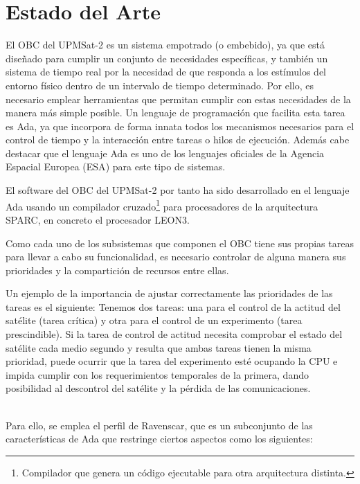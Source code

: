 
\chapter{Estado del Arte}
\label{chap:estado_del_arte}

El OBC del UPMSat-2 es un sistema empotrado (o embebido), ya que está
diseñado para cumplir un conjunto de necesidades específicas, y 
también un sistema de tiempo real por la necesidad de que responda a los
estímulos del entorno físico dentro de un intervalo de tiempo determinado.
Por ello, es necesario emplear herramientas que permitan cumplir con estas
necesidades de la manera más simple posible.
Un lenguaje de programación que facilita esta tarea es Ada, ya que incorpora
de forma innata todos los mecanismos necesarios para el control de tiempo y la
interacción entre tareas o hilos de ejecución.
Además cabe destacar que el lenguaje Ada es
uno de los lenguajes oficiales de la Agencia Espacial Europea
(ESA\cite{web-ESA}) para este tipo de sistemas.

El software del OBC del UPMSat-2 por tanto ha sido desarrollado en el lenguaje
Ada usando un compilador cruzado\footnote{Compilador que genera un código
  ejecutable para otra arquitectura distinta.}
para procesadores de la arquitectura SPARC, en concreto el procesador LEON3.

Como cada uno de los subsistemas que componen el OBC tiene sus propias
tareas para llevar a cabo su funcionalidad, es necesario
controlar de alguna manera sus prioridades y la compartición de recursos entre
ellas.

Un ejemplo de la importancia de ajustar correctamente las prioridades de las
tareas es el siguiente:
Tenemos dos tareas: una para el control de la actitud del satélite (tarea
crítica) y otra para
el control de un experimento (tarea prescindible). Si la tarea de control de
actitud necesita
comprobar el estado del satélite cada medio segundo y resulta que ambas tareas
tienen la misma prioridad, puede ocurrir que la tarea del experimento esté
ocupando la CPU e impida cumplir con los requerimientos temporales de la
primera, dando posibilidad al descontrol del satélite y la pérdida de las
comunicaciones.

\\

Para ello, se emplea el perfil de Ravenscar\cite{perfil-ravenscar},
que es un subconjunto de
las características de Ada que restringe ciertos aspectos como los siguientes:

